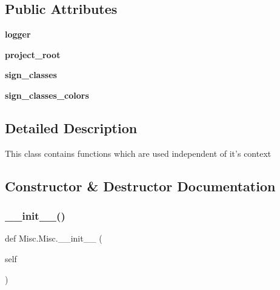 \subsection*{Public Attributes}
\begin{DoxyCompactItemize}
\item 
\mbox{\label{class_misc_1_1_misc_a9e3b421db2e29f51ea2ccf751dc3be28}} 
{\bfseries logger}
\item 
\mbox{\label{class_misc_1_1_misc_a0f0f549a61cc2c0682e3168d7e5d179d}} 
{\bfseries project\+\_\+root}
\item 
\mbox{\label{class_misc_1_1_misc_a18a052f60a59bcbb8c50936ed0e19501}} 
{\bfseries sign\+\_\+classes}
\item 
\mbox{\label{class_misc_1_1_misc_a3956381cbf1848ff93d562dad430dc36}} 
{\bfseries sign\+\_\+classes\+\_\+colors}
\end{DoxyCompactItemize}


\subsection{Detailed Description}
\begin{DoxyVerb}This class contains functions which are used independent of it's context
\end{DoxyVerb}
 

\subsection{Constructor \& Destructor Documentation}
\mbox{\label{class_misc_1_1_misc_a2361f15b11e4875dff86f4bedf58dc31}} 
\subsubsection{\texorpdfstring{\+\_\+\+\_\+init\+\_\+\+\_\+()}{\_\_init\_\_()}}
{\footnotesize\ttfamily def Misc.\+Misc.\+\_\+\+\_\+init\+\_\+\+\_\+ (\begin{DoxyParamCaption}\item[{}]{self }\end{DoxyParamCaption})}

